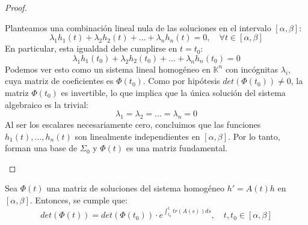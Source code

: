 \begin{proof}
\begin{itemize}
        Planteamos una combinación lineal nula de las soluciones en el intervalo $[\alpha, \beta]$:
        \[
            \lambda_1 h_1(t) + \lambda_2 h_2(t) + \ldots + \lambda_n h_n(t) = 0, \quad \forall t \in [\alpha, \beta]
        \]
        En particular, esta igualdad debe cumplirse en $t = t_0$:
        \[
            \lambda_1 h_1(t_0) + \lambda_2 h_2(t_0) + \ldots + \lambda_n h_n(t_0) = 0
        \]
        Podemos ver esto como un sistema lineal homogéneo en $\mathbb{K}^n$ con incógnitas $\lambda_i$, cuya matriz de coeficientes es $\Phi(t_0)$. Como por hipótesis $det(\Phi(t_0)) \neq 0$, la matriz $\Phi(t_0)$ es invertible, lo que implica que la única solución del sistema algebraico es la trivial:
        \[
            \lambda_1 = \lambda_2 = \ldots = \lambda_n = 0
        \]
        Al ser los escalares necesariamente cero, concluimos que las funciones $h_1(t), \ldots, h_n(t)$ son linealmente independientes en $[\alpha, \beta]$. Por lo tanto, forman una base de $\Sigma_0$ y $\Phi(t)$ es una matriz fundamental.
    \end{itemize}
\end{proof}


\begin{proposición} 
    Sea $\Phi(t)$ una matriz de soluciones del sistema homogéneo $h' = A(t) h$ en $[\alpha, \beta]$. Entonces, se cumple que:
    \[
        det(\Phi(t)) = det(\Phi(t_0)) \cdot e^{\int_{t_0}^{t} tr(A(s)) ds}, \quad t, t_0 \in [\alpha, \beta]
    \]    
\end{proposición}

